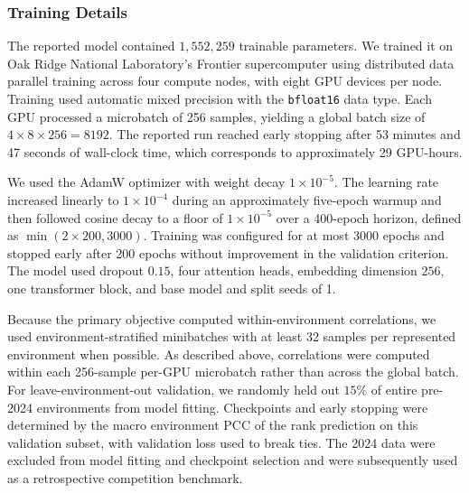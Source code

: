\subsubsection{Training Details}
The reported model contained $1{,}552{,}259$ trainable parameters. We trained it on Oak Ridge National Laboratory's Frontier supercomputer using distributed data parallel training across four compute nodes, with eight GPU devices per node. Training used automatic mixed precision with the \texttt{bfloat16} data type. Each GPU processed a microbatch of 256 samples, yielding a global batch size of $4 \times 8 \times 256 = 8192$. The reported run reached early stopping after 53 minutes and 47 seconds of wall-clock time, which corresponds to approximately 29 GPU-hours.

We used the AdamW optimizer \cite{adamW} with weight decay $1 \times 10^{-5}$. The learning rate increased linearly to $1 \times 10^{-4}$ during an approximately five-epoch warmup and then followed cosine decay to a floor of $1 \times 10^{-5}$ over a 400-epoch horizon, defined as $\min(2 \times 200, 3000)$. Training was configured for at most 3000 epochs and stopped early after 200 epochs without improvement in the validation criterion. The model used dropout $0.15$, four attention heads, embedding dimension $256$, one transformer block, and base model and split seeds of 1.

Because the primary objective computed within-environment correlations, we used environment-stratified minibatches with at least 32 samples per represented environment when possible. As described above, correlations were computed within each 256-sample per-GPU microbatch rather than across the global batch. For leave-environment-out validation, we randomly held out $15\%$ of entire pre-2024 environments from model fitting. Checkpoints and early stopping were determined by the macro environment PCC of the rank prediction on this validation subset, with validation loss used to break ties. The 2024 data were excluded from model fitting and checkpoint selection and were subsequently used as a retrospective competition benchmark.


